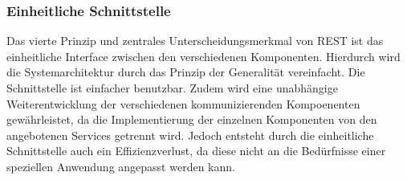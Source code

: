 \subsubsection{Einheitliche Schnittstelle}

Das vierte Prinzip und zentrales Unterscheidungsmerkmal von REST ist das einheitliche Interface zwischen den verschiedenen Komponenten. Hierdurch wird die Systemarchitektur durch das Prinzip der Generalität vereinfacht. Die Schnittstelle ist einfacher benutzbar. Zudem wird eine unabhängige Weiterentwicklung der verschiedenen kommunizierenden Kompoenenten gewährleistet, da die Implementierung der einzelnen Komponenten von den angebotenen Services getrennt wird. Jedoch entsteht durch die einheitliche Schnittstelle auch ein Effizienzverlust, da diese nicht an die Bedürfnisse einer speziellen Anwendung angepasst werden kann.
